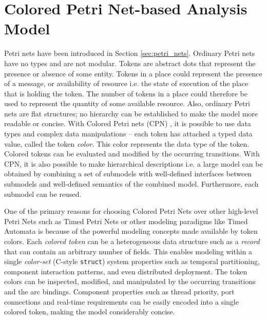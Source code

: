 \section{Colored Petri Net-based Analysis Model}

Petri nets have been introduced in Section \ref{sec:petri_nets}. Ordinary Petri nets have no types and are not modular. Tokens are abstract dots that represent the presence or absence of some entity. Tokens in a place could represent the presence of a message, or availability of resource i.e. the state of execution of the place that is holding the token. The number of tokens in a place could therefore be used to represent the quantity of some available resource. Also, ordinary Petri nets are flat structures; no hierarchy can be established to make the model more readable or concise. With Colored Petri nets (CPN) \cite{CPN}, it is possible to use data types and complex data manipulations -- each token has attached a typed data value, called the token \emph{color}. This color represents the data type of the token. Colored tokens can be evaluated and modified by the occurring transitions. With CPN, it is also possible to make hierarchical descriptions i.e. a large model can be obtained by combining a set of submodels with well-defined interfaces between submodels and well-defined semantics of the combined model. Furthermore, each submodel can be reused. 

One of the primary reasons for choosing Colored Petri Nets over other high-level Petri Nets such as Timed Petri Nets or other modeling paradigms like Timed Automata is because of the powerful modeling concepts made available by token colors. Each \emph{colored token} can be a heterogeneous data structure such as a \emph{record} that can contain an arbitrary number of fields. This enables modeling within a single \emph{color-set} (C-style \texttt{struct}) system properties such as temporal partitioning, component interaction patterns, and even distributed deployment. The token colors can be inspected, modified, and manipulated by the occurring transitions and the arc bindings. Component properties such as thread priority, port connections and real-time requirements can be easily encoded into a single colored token, making the model considerably concise. 

